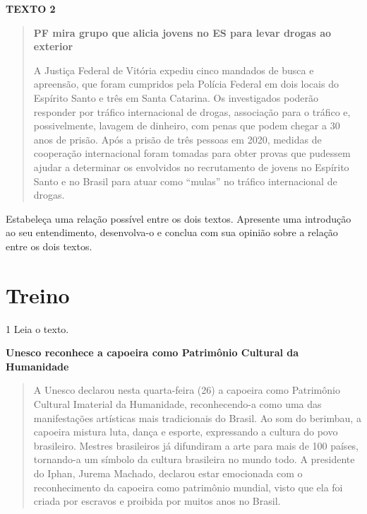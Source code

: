 \textbf{TEXTO 2}

\begin{quote}
\textbf{PF mira grupo que alicia jovens no ES para levar drogas ao exterior}

A Justiça Federal de Vitória expediu cinco mandados de busca e
apreensão, que foram cumpridos pela Polícia Federal em dois locais do
Espírito Santo e três em Santa Catarina. Os investigados poderão
responder por tráfico internacional de drogas, associação para o tráfico
e, possivelmente, lavagem de dinheiro, com penas que podem chegar a 30
anos de prisão. Após a prisão de três pessoas em 2020, medidas de
cooperação internacional foram tomadas para obter provas que pudessem
ajudar a determinar os envolvidos no recrutamento de jovens no Espírito
Santo e no Brasil para atuar como ``mulas'' no tráfico internacional de
drogas.

\end{quote}

Estabeleça uma relação possível entre os dois textos. Apresente uma
introdução ao seu entendimento, desenvolva-o e conclua com sua opinião
sobre a relação entre os dois textos.


\section{Treino}

\num{1} Leia o texto.

\textbf{Unesco reconhece a capoeira como Patrimônio Cultural da Humanidade}

\begin{quote}
A Unesco declarou nesta quarta-feira (26) a capoeira como Patrimônio
Cultural Imaterial da Humanidade, reconhecendo-a como uma das
manifestações artísticas mais tradicionais do Brasil. Ao som do
berimbau, a capoeira mistura luta, dança e esporte, expressando a
cultura do povo brasileiro. Mestres brasileiros já difundiram a arte
para mais de 100 países, tornando-a um símbolo da cultura brasileira no
mundo todo. A presidente do Iphan, Jurema Machado, declarou estar
emocionada com o reconhecimento da capoeira como patrimônio mundial,
visto que ela foi criada por escravos e proibida por muitos anos no
Brasil.

\end{quote}

